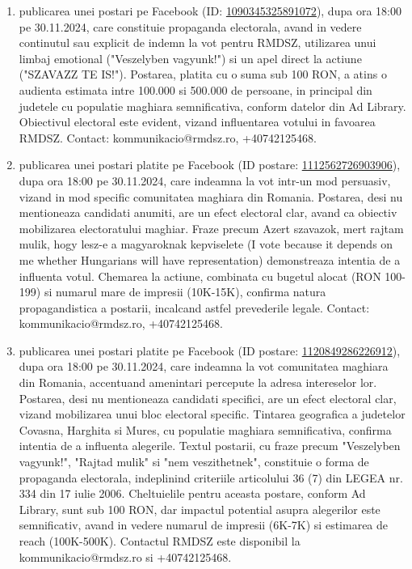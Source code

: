 \documentclass[a4paper,12pt]{article}
\begin{document}
\begin{enumerate}[leftmargin=*, label=\arabic*.)]
    \item publicarea unei postari pe Facebook (ID: \href{https://www.facebook.com/ads/library/?id=1090345325891072}{1090345325891072}), dupa ora 18:00 pe 30.11.2024, care constituie propaganda electorala, avand in vedere continutul sau explicit de indemn la vot pentru RMDSZ, utilizarea unui limbaj emotional ("Veszelyben vagyunk!") si un apel direct la actiune ("SZAVAZZ TE IS!").  Postarea, platita cu o suma sub 100 RON, a atins o audienta estimata intre 100.000 si 500.000 de persoane, in principal din judetele cu populatie maghiara semnificativa, conform datelor din Ad Library. Obiectivul electoral este evident, vizand influentarea votului in favoarea RMDSZ.  Contact: kommunikacio@rmdsz.ro, +40742125468.
    \item publicarea unei postari platite pe Facebook (ID postare: \href{https://www.facebook.com/ads/library/?id=1112562726903906}{1112562726903906}), dupa ora 18:00 pe 30.11.2024, care indeamna la vot intr-un mod persuasiv, vizand in mod specific comunitatea maghiara din Romania.  Postarea, desi nu mentioneaza candidati anumiti, are un efect electoral clar, avand ca obiectiv mobilizarea electoratului maghiar. Fraze precum Azert szavazok, mert rajtam mulik, hogy lesz-e a magyaroknak kepviselete (I vote because it depends on me whether Hungarians will have representation) demonstreaza intentia de a influenta votul.  Chemarea la actiune, combinata cu bugetul alocat (RON 100-199) si numarul mare de impresii (10K-15K), confirma natura propagandistica a postarii, incalcand astfel prevederile legale.  Contact: kommunikacio@rmdsz.ro, +40742125468.
    \item publicarea unei postari platite pe Facebook (ID postare: \href{https://www.facebook.com/ads/library/?id=1120849286226912}{1120849286226912}), dupa ora 18:00 pe 30.11.2024, care indeamna la vot comunitatea maghiara din Romania, accentuand amenintari percepute la adresa intereselor lor.  Postarea, desi nu mentioneaza candidati specifici, are un efect electoral clar, vizand mobilizarea unui bloc electoral specific.  Tintarea geografica a judetelor Covasna, Harghita si Mures, cu populatie maghiara semnificativa, confirma intentia de a influenta alegerile.  Textul postarii, cu fraze precum "Veszelyben vagyunk!", "Rajtad mulik" si "nem veszithetnek",  constituie o forma de propaganda electorala, indeplinind criteriile articolului 36 (7) din LEGEA nr. 334 din 17 iulie 2006.  Cheltuielile pentru aceasta postare, conform Ad Library, sunt sub 100 RON, dar impactul potential asupra alegerilor este semnificativ, avand in vedere numarul de impresii (6K-7K) si estimarea de reach (100K-500K).  Contactul RMDSZ este disponibil la kommunikacio@rmdsz.ro si +40742125468.

\end{enumerate}
\end{document}
